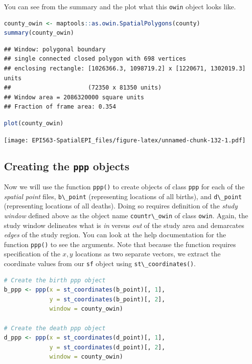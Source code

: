 \documentclass[
]{book}
\newcommand{\passthrough}[1]{#1}
\begin{document}
You can see from the summary and the plot what this \passthrough{\lstinline!owin!} object looks like.

\begin{lstlisting}[language=R]
county_owin <- maptools::as.owin.SpatialPolygons(county)
summary(county_owin)
\end{lstlisting}

\begin{lstlisting}
## Window: polygonal boundary
## single connected closed polygon with 698 vertices
## enclosing rectangle: [1026366.3, 1098719.2] x [1220671, 1302019.3] units
##                      (72350 x 81350 units)
## Window area = 2086320000 square units
## Fraction of frame area: 0.354
\end{lstlisting}

\begin{lstlisting}[language=R]
plot(county_owin)
\end{lstlisting}

\texttt{[image: EPI563-SpatialEPI\_files/figure-latex/unnamed-chunk-132-1.pdf]}

\hypertarget{creating-the-ppp-objects}{%
\subsection{\texorpdfstring{Creating the \texttt{ppp} objects}{Creating the ppp objects}}\label{creating-the-ppp-objects}}

Now we will use the function \passthrough{\lstinline!ppp()!} to create objects of class \passthrough{\lstinline!ppp!} for each of the \emph{spatial point} files, \passthrough{\lstinline!b\_point!} (representing locations of all births), and \passthrough{\lstinline!d\_point!} (representing locations of all deaths). Doing so requires definition of the \emph{study window} defined above as the object name \passthrough{\lstinline!countr\_owin!} of class \passthrough{\lstinline!owin!}. Again, the study window delineates what is \emph{in} versus \emph{out} of the study area and demarcates \emph{edges} of the study region. You can look at the help documentation for the function \passthrough{\lstinline!ppp()!} to see the arguments. Note that because the function requires specification of the \(x,y\) locations as two separate vectors, we extract the coordinate values from our \passthrough{\lstinline!sf!} object using \passthrough{\lstinline!st\_coordinates()!}.

\begin{lstlisting}[language=R]
# Create the birth ppp object
b_ppp <- ppp(x = st_coordinates(b_point)[, 1], 
             y = st_coordinates(b_point)[, 2],
             window = county_owin)

# Create the death ppp object
d_ppp <- ppp(x = st_coordinates(d_point)[, 1], 
             y = st_coordinates(d_point)[, 2],
             window = county_owin)
\end{lstlisting}
\end{document}
